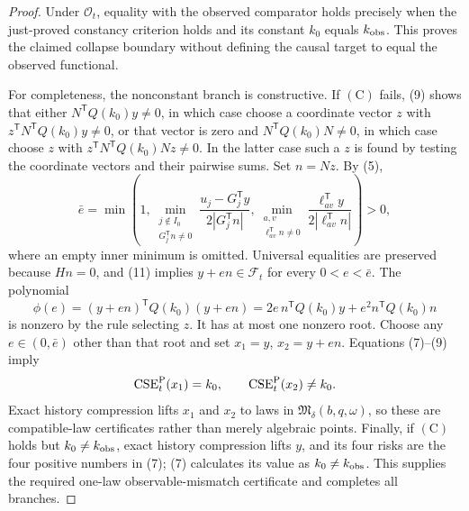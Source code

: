 \documentclass{article}
\begin{document}
\begin{proof}
Under \(\mathcal O_t\), equality with the observed comparator holds precisely when the just-proved constancy criterion holds and its constant \(k_0\) equals \(k_{\rm obs}\).  This proves the claimed collapse boundary without defining the causal target to equal the observed functional.

For completeness, the nonconstant branch is constructive.  If \((\mathrm C)\) fails, (9) shows that either \(N^{\mathsf T}Q(k_0)y\neq0\), in which case choose a coordinate vector \(z\) with
\(z^{\mathsf T}N^{\mathsf T}Q(k_0)y\neq0\), or that vector is zero and \(N^{\mathsf T}Q(k_0)N\neq0\), in which case choose \(z\) with
\(z^{\mathsf T}N^{\mathsf T}Q(k_0)Nz\neq0\).  In the latter case such a \(z\) is found by testing the coordinate vectors and their pairwise sums.  Set \(n=Nz\).  By (5),
\[
 \bar e=\min\left(1,
 \min_{\substack{j\notin I_0\\G_j^{\mathsf T}n\neq0}}
 \frac{u_j-G_j^{\mathsf T}y}{2|G_j^{\mathsf T}n|},
 \min_{\substack{a,v\\\ell_{av}^{\mathsf T}n\neq0}}
 \frac{\ell_{av}^{\mathsf T}y}{2|\ell_{av}^{\mathsf T}n|}
 \right)>0,                                                  \tag{11}
\]
where an empty inner minimum is omitted.  Universal equalities are preserved because \(Hn=0\), and (11) implies \(y+en\in\mathcal F_t\) for every \(0<e<\bar e\).  The polynomial
\[
 \phi(e)=(y+en)^{\mathsf T}Q(k_0)(y+en)
 =2e\,n^{\mathsf T}Q(k_0)y+e^2n^{\mathsf T}Q(k_0)n
\]
is nonzero by the rule selecting \(z\).  It has at most one nonzero root.  Choose any \(e\in(0,\bar e)\) other than that root and set
\(x_1=y\), \(x_2=y+en\).  Equations (7)--(9) imply
\[
 \operatorname{CSE}^{\rm P}_t(x_1)=k_0,
 \qquad \operatorname{CSE}^{\rm P}_t(x_2)\neq k_0.
\]
Exact history compression lifts \(x_1\) and \(x_2\) to laws in \(\mathfrak M_\delta(b,q,\omega)\), so these are compatible-law certificates rather than merely algebraic points.  Finally, if \((\mathrm C)\) holds but \(k_0\neq k_{\rm obs}\), exact history compression lifts \(y\), and its four risks are the four positive numbers in (7); (7) calculates its value as \(k_0\neq k_{\rm obs}\).  This supplies the required one-law observable-mismatch certificate and completes all branches.
\end{proof}
\end{document}
